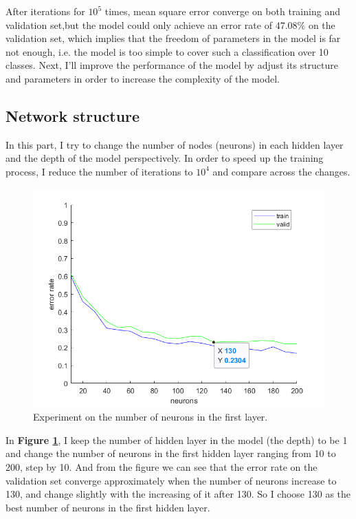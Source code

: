 \documentclass{article}
\begin{document}
After iterations for $10^5$ times, mean square error converge on both training and validation set,but the model could only achieve an error rate of $47.08\%$ on the validation set, which implies that the freedom of parameters in the model is far not enough, i.e. the model is too simple to cover such a classification over 10 classes. Next, I'll improve the performance of the model by adjust its structure and parameters in order to increase the complexity of the model.


\subsection{Network structure}

In this part, I try to change the number of nodes (neurons) in each hidden layer and the depth of the model perspectively. In order to speed up the training process, I reduce the number of iterations to $10^4$ and compare across the changes.

\begin{figure}[H]
	\centering
	\includegraphics[scale=0.5]{figure2}
	\caption{Experiment on the number of neurons in the first layer.}
	\label{fig2}
\end{figure}

In \textbf{Figure \ref{fig2}}, I keep the number of hidden layer in the model (the depth) to be 1 and change the number of neurons in the first hidden layer ranging from 10 to 200, step by 10. And from the figure we can see that the error rate on the validation set converge approximately when the number of neurons increase to 130, and change slightly with the increasing of it after 130. So I choose 130 as the best number of neurons in the first hidden layer.
\end{document}
